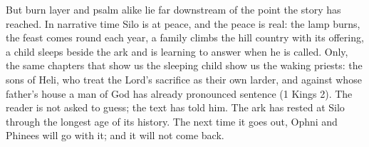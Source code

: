 But burn layer and psalm alike lie far downstream of the point the story has
reached. In narrative time Silo is at peace, and the peace is real: the lamp
burns, the feast comes round each year, a family climbs the hill country with
its offering, a child sleeps beside the ark and is learning to answer when he
is called. Only, the same chapters that show us the sleeping child show us
the waking priests: the sons of Heli, who treat the Lord's sacrifice as their
own larder, and against whose father's house a man of God has already
pronounced sentence (1 Kings 2). The reader is not asked to guess; the text
has told him. The ark has rested at Silo through the longest age of its
history. The next time it goes out, Ophni and Phinees will go with it; and it
will not come back.

